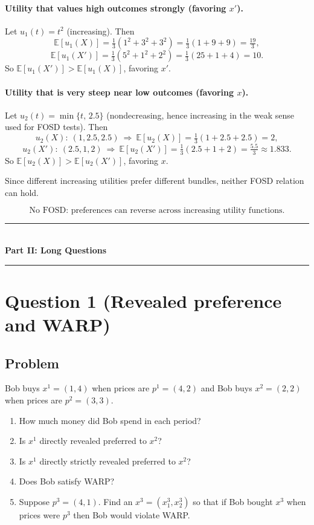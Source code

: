 \documentclass[12pt]{article}
\newcommand{\E}{\mathbb{E}}
\begin{document}
\paragraph{Utility that values high outcomes strongly (favoring \(x'\)).}
Let \(u_1(t)=t^2\) (increasing). Then
\[
\E[u_1(X)]=\tfrac13(1^2+3^2+3^2)=\tfrac13(1+9+9)=\tfrac{19}{3},
\]
\[
\E[u_1(X')]=\tfrac13(5^2+1^2+2^2)=\tfrac13(25+1+4)=10.
\]
So \(\E[u_1(X')]> \E[u_1(X)]\), favoring \(x'\).

\paragraph{Utility that is very steep near low outcomes (favoring \(x\)).}
Let \(u_2(t)=\min\{t,\,2.5\}\) (nondecreasing, hence increasing in the weak sense used for FOSD tests).
Then
\[
u_2(X):\ (1,2.5,2.5)\ \Rightarrow\ \E[u_2(X)]=\tfrac13(1+2.5+2.5)=2,
\]
\[
u_2(X'):\ (2.5,1,2)\ \Rightarrow\ \E[u_2(X')]=\tfrac13(2.5+1+2)=\tfrac{5.5}{3}\approx 1.833.
\]
So \(\E[u_2(X)]>\E[u_2(X')]\), favoring \(x\).

Since different increasing utilities prefer different bundles, neither FOSD relation can hold.

\[
\boxed{\text{No FOSD: preferences can reverse across increasing utility functions.}}
\]

\newpage
\begin{center}
  \rule{0.9\textwidth}{0.6pt}\\[6pt]
  {\Large \textbf{Part II: Long Questions}}\\[4pt]
  \rule{0.9\textwidth}{0.6pt}
\end{center}

\section*{Question 1 (Revealed preference and WARP)}
\subsection*{Problem}
Bob buys \(x^{1}=(1,4)\) when prices are \(p^{1}=(4,2)\) and Bob buys \(x^{2}=(2,2)\) when prices are \(p^{2}=(3,3)\).
\begin{enumerate}[label=(\alph*), leftmargin=*]
\item How much money did Bob spend in each period?
\item Is \(x^{1}\) directly revealed preferred to \(x^{2}\)?
\item Is \(x^{1}\) directly strictly revealed preferred to \(x^{2}\)?
\item Does Bob satisfy WARP?
\item Suppose \(p^{3}=(4,1)\). Find an \(x^{3}=(x^{3}_1,x^{3}_2)\) so that if Bob bought \(x^{3}\) when prices were \(p^{3}\) then Bob would violate WARP.
\end{enumerate}
\end{document}
